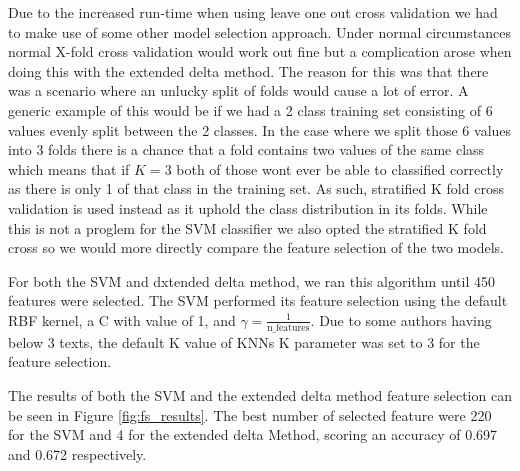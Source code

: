 Due to the increased run-time when using leave one out cross validation we had
to make use of some other model selection approach. Under normal circumstances
normal X-fold cross validation would work out fine but a complication arose when
doing this with the extended delta method. The reason for this was that there
was a scenario where an unlucky split of folds would cause a lot of error. A
generic example of this would be if we had a 2 class training set consisting
of 6 values evenly split between the 2 classes. In the case where we split
those 6 values into 3 folds there is a chance that a fold contains two values
of the same class which means that if $K = 3$ both of those wont ever be able
to classified correctly as there is only 1 of that class in the training set.
As such, stratified K fold cross validation is used instead as it uphold the
class distribution in its folds. While this is not a proglem for the \gls{SVM}
classifier we also opted the stratified K fold cross so we would more directly
compare the feature selection of the two models.

For both the \gls{SVM} and dxtended delta method, we ran this algorithm
until 450 features were selected. The \gls{SVM} performed its feature selection
using the default RBF kernel, a C with value of 1, and $\gamma =
\frac{1}{\text{n\_features}}$. Due to some authors having below 3 texts,
the default K value of \glspl{KNN} K parameter was set to 3 for the feature
selection.

The results of both the \gls{SVM} and the extended delta method feature selection can
be seen in Figure \ref{fig:fs_results}. The best number of selected feature were
220 for the SVM and 4 for the extended delta Method, scoring an accuracy of
0.697 and 0.672 respectively.

